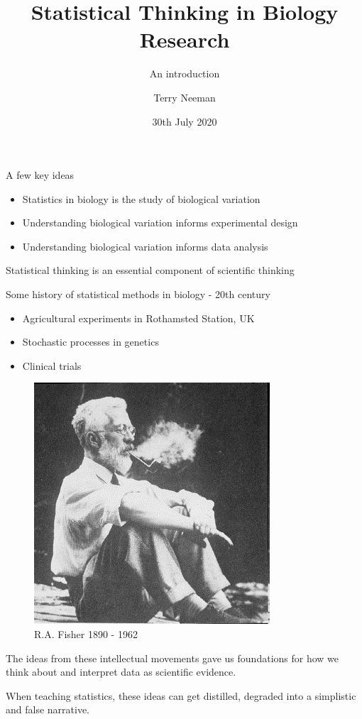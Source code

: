 \documentclass[
  12pt,
  ignorenonframetext,
  aspectratio=169,
]{beamer}
\title{Statistical Thinking in Biology Research}
\subtitle{An introduction}
\author{Terry Neeman}
\date{30th July 2020}
\institute{Australian National University}
\providecommand{\tightlist}{%
  \setlength{\itemsep}{0pt}\setlength{\parskip}{0pt}}
\begin{document}
\frame{\titlepage}

\begin{frame}{A few key ideas}
\protect\hypertarget{a-few-key-ideas}{}

\begin{itemize}
\tightlist
\item
  Statistics in biology is the study of biological variation
\item
  Understanding biological variation informs experimental design
\item
  Understanding biological variation informs data analysis
\end{itemize}

\begin{block}{Statistical thinking is an essential component of
scientific thinking}

\end{block}

\end{frame}

\begin{frame}{Some history of statistical methods in biology - 20th
century}
\protect\hypertarget{some-history-of-statistical-methods-in-biology---20th-century}{}

\begin{itemize}
\tightlist
\item
  Agricultural experiments in Rothamsted Station, UK
\item
  Stochastic processes in genetics
\item
  Clinical trials
\end{itemize}

\begin{figure}

{\centering \includegraphics[width=0.3\linewidth,height=0.3\textheight]{../images/Lecture1_RA_Fisher} 

}

\caption{R.A. Fisher 1890 - 1962}\label{fig:unnamed-chunk-1}
\end{figure}

The ideas from these intellectual movements gave us foundations for how
we think about and interpret data as scientific evidence.

When teaching statistics, these ideas can get distilled, degraded into a
simplistic and false narrative.

\end{frame}
\end{document}
